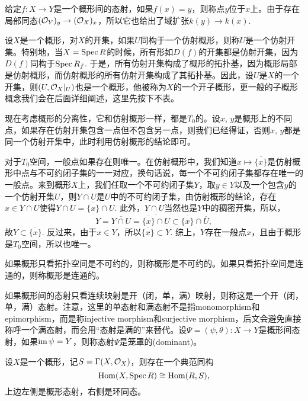 给定$f:X\to Y$是一个概形间的态射，如果$f(x)=y$，则称点$y$位于$x$上。由于存在局部同态$(\mathcal{O}_Y)_y\to (\mathcal{O}_X)_x$，所以它也给出了域扩张$k(y)\to k(x)$. 

\begin{para}[概形的拓扑]
设$X$是一个概形，对$X$的开集，如果$U$同构于一个仿射概形，则称$U$是一个仿射开集。特别地，当$X=\operatorname{Spec} R$的时候，所有形如$D(f)$的开集都是仿射开集，因为$D(f)$同构于$\operatorname{Spec} R_f$. 于是，所有仿射开集构成了概形的拓扑基，因为概形局部是仿射概形，而仿射概形的所有仿射开集构成了其拓扑基。因此，设$U$是$X$的一个开集，则$(U,\mathcal{O}_X|_U)$也是一个概形，他被称为$X$的一个开子概形，更一般的子概形概念我们会在后面详细阐述，这里先按下不表。

现在考虑概形的分离性，它和仿射概形一样，都是$T_0$的。设$x$, $y$是概形上的不同点，如果存在仿射开集包含一点但不包含另一点，则我们已经得证，否则$x$, $y$都是同一个仿射开集中，此时利用仿射概形的结论即可。

对于$T_0$空间，一般点如果存在则唯一。在仿射概形中，我们知道$x\mapsto \overline{\{x\}}$是仿射概形中点与不可约闭子集的一一对应，换句话说，每一个不可约闭子集都存在唯一的一般点。来到概形$X$上，我们任取一个不可约闭子集$Y$，取$y\in Y$以及一个包含$y$的一个仿射开集$U$，则$Y\cap U$是$U$中的不可约闭子集，由仿射概形的结论，存在$x\in Y\cap U$使得$Y\cap U=\overline{\{x\}}\cap U$. 此外，$Y\cap U$当然也是$Y$中的稠密开集，所以，
\[
	Y=\overline{Y\cap U}=\overline{\overline{\{x\}}\cap U}\subset \overline{\{x\}}\cap \overline{U},
\]
故$Y\subset \overline{\{x\}}$. 反过来，由于$x\in Y$，所以$\overline{\{x\}}\subset Y$. 综上，$Y$存在一般点$x$，且由于概形是$T_0$空间，所以也唯一。

如果概形只看拓扑空间是不可约的，则称概形是不可约的。如果只看拓扑空间是连通的，则称概形是连通的。

如果概形间的态射只看连续映射是开（闭，单，满）映射，则称这是一个开（闭，单，满）态射。注意，这里的单态射和满态射不是指monomorphism和epimorphism，而是称injective morphism和surjective morphism，后文会避免直接称呼一个满态射，而会用“态射是满的”来替代。设$\Psi=(\psi,\theta):X\to Y$是概形间态射，如果$\operatorname{im}\psi = Y$，则称态射$\Psi$是笼罩的(dominant)。
\end{para}

\begin{pro}
设$X$是一个概形，记$S=\Gamma(X,\mathcal{O}_X)$，则存在一个典范同构
\[
	\operatorname{Hom}(X,\operatorname{Spec} R)\cong \operatorname{Hom}(R,S),
\]
上边左侧是概形态射，右侧是环同态。
\end{pro}

